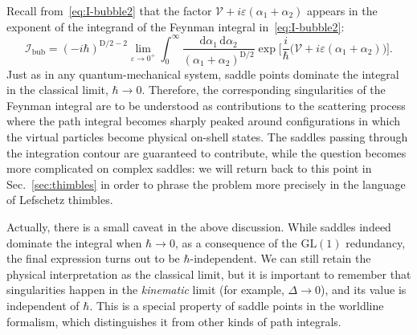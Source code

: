 \documentclass[12pt]{article}
\numberwithin{figure}{section}
\def \be {\begin{equation}}
\def \ee {\end{equation}}
\def \D {\mathrm{D}}
\def \d {\mathrm{d}}
\def \eps {\varepsilon}
\def \V {\mathcal{V}}
\def \I {\mathcal{I}}
\def \GL {\mathrm{GL}}
\def \bubble {\mathrm{bub}}
\begin{document}
	Recall from~\eqref{eq:I-bubble2} that the factor $\V + i\eps(\alpha_1 {+} \alpha_2)$ appears in the exponent of the integrand of the Feynman integral in~\eqref{eq:I-bubble2}:
	\be
	\I_\bubble = \left(- i \hbar \right)^{\D/2 - 2}  \lim_{\eps \to 0^+} \int_0^\infty \frac{\d\alpha_1\, \d\alpha_2}{(\alpha_1 {+} \alpha_2)^{\D/2}} \exp \bigg[ \frac{i}{\hbar} \bigg( \V + i\eps (\alpha_1 {+} \alpha_2)\bigg) \bigg].
	\ee
	Just as in any quantum-mechanical system, saddle points dominate the integral in the classical limit, $\hbar \to 0$. Therefore, the corresponding singularities of the Feynman integral are to be understood as contributions to the scattering process where the path integral becomes sharply peaked around configurations in which the virtual particles become physical on-shell states. The saddles passing through the integration contour are guaranteed to contribute, while the question becomes more complicated on complex saddles: we will return back to this point in Sec.~\ref{sec:thimbles} in order to phrase the problem more precisely in the language of Lefschetz thimbles.
	
	Actually, there is a small caveat in the above discussion. While saddles indeed dominate the integral when $\hbar \to 0$, as a consequence of the $\GL(1)$ redundancy, the final expression turns out to be $\hbar$-independent. We can still retain the physical interpretation as the classical limit, but it is important to remember that singularities happen in the \emph{kinematic} limit (for example, $\Delta\to0$), and its value is independent of $\hbar$. This is a special property of saddle points in the worldline formalism, which distinguishes it from other kinds of path integrals.
	
\end{document}

